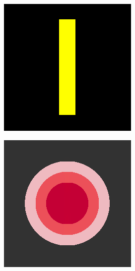 \documentclass[hidelinks, a4paper,12pt]{article}
\numberwithin{equation}{section}							%
\numberwithin{equation}{section}
\begin{document}
{\begin{figure}[H]
\begin{subfigure}{0.4\linewidth}
		\includegraphics[width=0.8\linewidth]{images/result_ex1/splitbergman01.png}
	\end{subfigure}
	\begin{subfigure}{0.4\linewidth}
		\centering
		\includegraphics[width=0.8\linewidth]{images/result_ex1/splitbergman02.png}
	\end{subfigure}
	\begin{subfigure}{0.4\linewidth}
		\centering

\end{subfigure}
\end{figure}}
\end{document}
